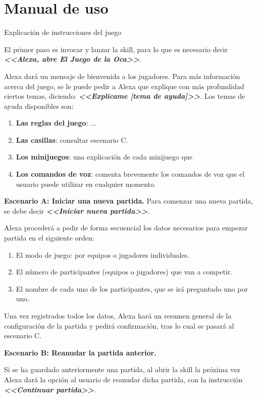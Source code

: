 \section{Manual de uso}
Explicación de instrucciones del juego

El primer paso es invocar y lanzar la skill, para lo que es necesario decir \textbf{\textit{<<Alexa, abre El Juego de la Oca>>}}.

Alexa dará un mensaje de bienvenida a los jugadores. Para más información acerca del juego, se le puede pedir a Alexa que explique con más profundidad ciertos temas, diciendo: \textbf{\textit{<<Explícame [tema de ayuda]>>}}. Los temas de ayuda disponibles son: 
\begin{enumerate}
	\item \textbf{Las reglas del juego}: ...
	\item \textbf{Las casillas}: consultar escenario C.
	\item \textbf{Los minijuegos}: una explicación de cada minijuego que 
	\item \textbf{Los comandos de voz}: comenta brevemente los comandos de voz que el usuario puede utilizar en cualquier momento.
\end{enumerate}

\vspace{1cm}
\textbf{Escenario A: Iniciar una nueva partida.}
Para comenzar una nueva partida, se debe decir \textbf{\textit{<<Iniciar nueva partida>>}}.

Alexa procederá a pedir de forma secuencial los datos necesarios para empezar partida en el siguiente orden:
\begin{enumerate}
	\item El modo de juego: por equipos o jugadores individuales.
	\item El número de participantes (equipos o jugadores) que van a competir.
	\item El nombre de cada uno de los participantes, que se irá preguntado uno por uno.
\end{enumerate}

Una vez registrados todos los datos, Alexa hará un resumen general de la configuración de la partida y pedirá confirmación, tras lo cual se pasará al escenario C.

\vspace{1cm}
\textbf{Escenario B: Reanudar la partida anterior.}

Si se ha guardado anteriormente una partida, al abrir la skill la próxima vez Alexa dará la opción al usuario de reanudar dicha partida, con la instrucción \textbf{\textit{<<Continuar partida>>}}.

